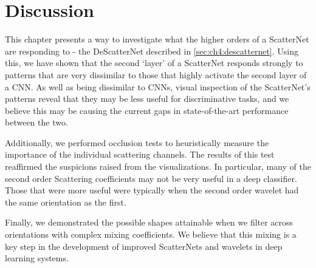 \section{Discussion}
This chapter presents a way to investigate what the higher orders of a ScatterNet
are responding to - the DeScatterNet described in \autoref{sec:ch4:descatternet}.
Using this, we have shown that the second `layer' of a ScatterNet 
responds strongly to patterns that are very dissimilar to those that highly activate the
second layer of a CNN\@. As well as being dissimilar to CNNs, visual inspection of the
ScatterNet's patterns reveal that they may be less useful for discriminative
tasks, and we believe this may be causing the current gaps in state-of-the-art
performance between the two. 

Additionally, we performed occlusion tests to heuristically measure the
importance of the individual scattering channels. The results of this test
reaffirmed the suspicions raised from the visualizations. In particular, many of
the second order Scattering coefficients may not be very useful in a deep
classifier. Those that were more useful were typically when the second order wavelet
had the same orientation as the first.

Finally, we demonstrated the possible shapes attainable when we filter
across orientations with complex mixing coefficients. We believe that this 
mixing is a key step in the development of improved ScatterNets and wavelets in deep
learning systems.

